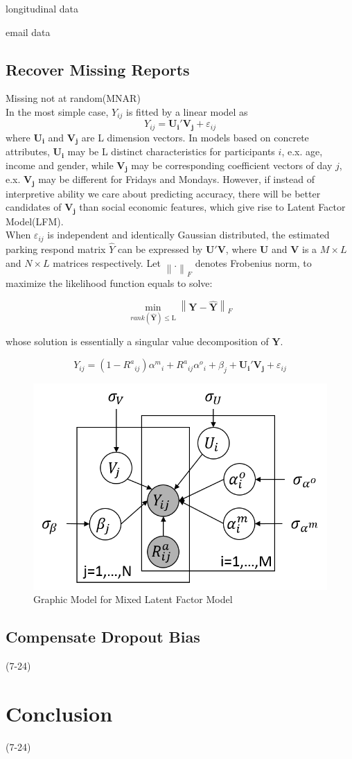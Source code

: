 \documentclass[preprint,12pt]{elsarticle}
\begin{document}
longitudinal data

email data

\subsection{Recover Missing Reports} 
Missing not at random(MNAR)\\

In the most simple case, $Y_{ij}$ is fitted by a linear model as
\[{Y_{ij}} = {\mathbf{U_i}}'{\mathbf{V_j}} + {\varepsilon _{ij}}\]
where $\mathbf{U_i}$ and $\mathbf{V_j}$ are L dimension vectors. In models based on concrete attributes, $\mathbf{U_i}$ may be L distinct characteristics for participants $i$, e.x. age, income and gender, while $\mathbf{V_j}$ may be corresponding coefficient vectors of day $j$, e.x. $\mathbf{V_j}$ may be different for Fridays and Mondays. However, if instead of interpretive ability we care about predicting accuracy, there will be better candidates of $\mathbf{V_j}$ than social economic features, which give rise to Latent Factor Model(LFM).\\     

When $\varepsilon _{ij}$ is independent and identically Gaussian distributed, the estimated parking respond matrix $\hat{Y}$ can be expressed by $\mathbf{U}'\mathbf{V}$, where $\mathbf{U}$ and $\mathbf{V}$ is a $M\times L$ and $N\times L$ matrices respectively. Let ${\left\| . \right\|_F}$ denotes Frobenius norm, to maximize the likelihood function equals to solve:

\[{\min _{rank(\widehat {\mathbf{Y}}) \leqslant {\text{L}}}}{\left\| {{\mathbf{Y - }}\widehat {\mathbf{Y}}} \right\|_F}\]

whose solution is essentially a singular value decomposition of $\mathbf{Y}$. 

\[{Y_{ij}} = (1 - {R^a}_{ij}){\alpha ^m}_i + {R^a}_{ij}{\alpha ^o}_i + {\beta _j} + {{\mathbf{U}}_{\mathbf{i}}}{\mathbf{'}}{{\mathbf{V}}_{\mathbf{j}}} + {\varepsilon _{ij}}\]


\begin{figure}[!htb]
\centering
\includegraphics[scale=0.6]{MLFM.png}
\caption{Graphic Model for Mixed Latent Factor Model}
\label{fig:MLFM}
\end{figure}

\subsection{Compensate Dropout Bias} (7-24)

\section{Conclusion} (7-24)
\end{document}
